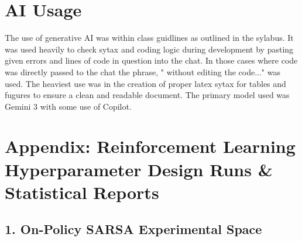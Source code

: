 \documentclass{article}
\begin{document}
\section{AI Usage}
The use of generative AI was within class guidlines as outlined in the sylabus. It was used heavily to check sytax and coding logic during development by pasting given errors and lines of code in question into the chat. In those cases where code was directly passed to the chat  the phrase, " without editing the code..." was used. The heaviest use was in the creation of proper latex sytax for tables and fugures to ensure a clean and readable document. The primary model used was Gemini 3 with some use of Copilot.
\section{Appendix: Reinforcement Learning Hyperparameter Design Runs \& Statistical Reports}
\label{sec:appendix_rl_results}

\subsection*{1. On-Policy SARSA Experimental Space}
\end{document}
